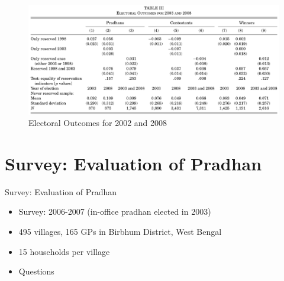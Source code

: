 \documentclass[
  10pt,
  ignorenonframetext,
  aspectratio=43,
]{beamer}
\providecommand{\tightlist}{%
  \setlength{\itemsep}{0pt}\setlength{\parskip}{0pt}}
\begin{document}
\begin{frame}
\begin{figure}
\centering
\includegraphics{20220523-qje-beaman-duflo-powerful-women.assets/table3-electoral outcomes.png}
\caption{Electoral Outcomes for 2002 and 2008}
\end{figure}
\end{frame}

\hypertarget{survey-evaluation-of-pradhan}{%
\section{Survey: Evaluation of
Pradhan}\label{survey-evaluation-of-pradhan}}

\begin{frame}{Survey: Evaluation of Pradhan}
\begin{itemize}
\tightlist
\item
  Survey: 2006-2007 (in-office pradhan elected in 2003)
\item
  495 villages, 165 GPs in Birbhum District, West Bengal
\item
  15 households per village
\item
  Questions

\end{itemize}
\end{frame}
\end{document}
